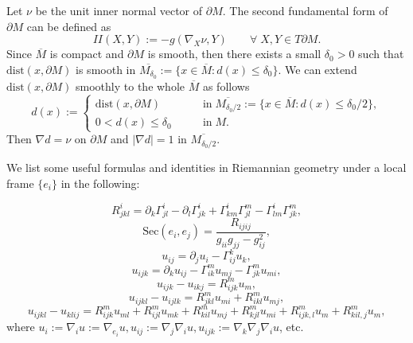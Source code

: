 \documentclass[12pt]{amsart}
\theoremstyle{definition}
\theoremstyle{remark}
\numberwithin{equation}{section}
\begin{document}
Let $\nu$ be the unit inner normal vector of $\partial M$. The second fundamental form of $\partial M$ can be defined as
\begin{equation}
I\!\!I (X, Y) := -g(\nabla_X \nu, Y) \qquad \forall \; X, Y \in T\partial M.
\end{equation}
Since $\overline{M}$ is compact and $\partial M$ is smooth, then there exists a small $\delta_0 > 0$ such that $\text{dist}(x, \partial M)$ is smooth in $\overline{M_{\delta_0}}:=\{ x\in \overline{M}: d(x) \leq \delta_0 \}$. We can extend $\text{dist}(x, \partial M)$ smoothly to the whole $\overline{M}$ as follows
\begin{equation}\label{dist2bd_function}
d(x) := \left \{ 
\begin{aligned}
\text{dist}(x, \partial M) \qquad & \text{in} \; \overline{M_{\delta_0/2}} := \{ x\in \overline{M}: d(x) \leq \delta_0/2 \},\\
0 < d(x) \leq \delta_0 \qquad & \text{in} \; M.
\end{aligned}\right.
\end{equation}
Then $\nabla d = \nu$ on $\partial M$ and $|\nabla d| = 1$ in $\overline{M_{\delta_0/2}}$.



We list some useful formulas and identities in Riemannian geometry under a local frame $\{e_i\}$ in the following:

\begin{equation}
R^i_{jkl} = \partial_k\Gamma^i_{jl} - \partial_l\Gamma^i_{jk} + \Gamma^i_{km}\Gamma^m_{jl} - \Gamma^i_{lm}\Gamma^m_{jk},
\end{equation} 
%
\begin{equation}
\text{Sec}(e_i, e_j) = \frac{R_{ijij}}{g_{ii}g_{jj} - g_{ij}^2},
\end{equation}
%
\begin{equation}
u_{ij} = \partial_j u_i - \Gamma^k_{ij}u_k,
\end{equation}
%
\begin{equation}
u_{ijk} = \partial_k u_{ij} - \Gamma^m_{ik}u_{mj} - \Gamma^m_{jk}u_{mi},
\end{equation}
%
\begin{equation}\label{ijk-ikj}
u_{ijk} - u_{ikj} = R^m_{ijk}u_m,
\end{equation}
%
\begin{equation}
u_{ijkl} - u_{ijlk} = R^m_{jkl} u_{mi} + R^m_{ikl} u_{mj},
\end{equation}
%
\begin{equation}\label{ijkl-klij}
u_{ijkl} - u_{klij} = R^m_{ijk} u_{ml} + R^m_{ijl} u_{mk} + R^m_{kil} u_{mj} + R^m_{kjl} u_{mi} + R^m_{ijk,l} u_m + R^m_{kil,j} u_m,
\end{equation}
where $u_i := \nabla_i u := \nabla_{e_i} u, u_{ij} := \nabla_j \nabla_i u, u_{ijk} :=\nabla_k \nabla_j \nabla_i u$, etc.
\end{document}
